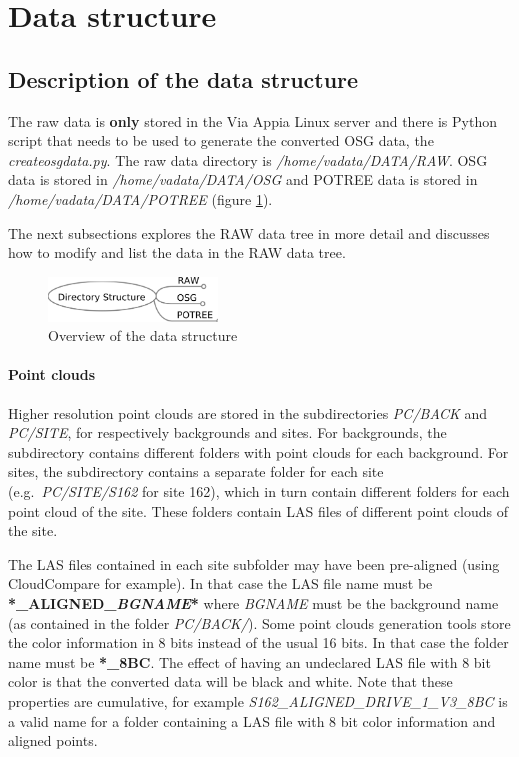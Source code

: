 \section{Data structure}
\label{sec:data_structure}

\subsection{Description of the data structure}
The raw data is \textbf{only} stored in the Via Appia Linux server and there is Python script that needs to be used to generate the converted OSG data, the \textit{createosgdata.py}. The raw data directory is \textit{/home/vadata/DATA/RAW}. OSG data is stored in \textit{/home/vadata/DATA/OSG} and POTREE data is stored in \textit{/home/vadata/DATA/POTREE} (figure \ref{fig:directory_structure_overview}). 

The next subsections explores the RAW data tree in more detail and discusses how to modify and list the data in the RAW data tree.

\begin{figure}[!ht]
 \centering
 \includegraphics[width=0.4\textwidth]{fig/directory_structure_overview}
 \caption{Overview of the data structure}
 \label{fig:directory_structure_overview}
\end{figure}

\paragraph{Point clouds}
Higher resolution point clouds are stored in the subdirectories \textit{PC/BACK} and \textit{PC/SITE}, for respectively backgrounds and sites. For backgrounds, the subdirectory contains different folders with point clouds for each background. For sites, the subdirectory contains a separate folder for each site (e.g.\ \textit{PC/SITE/S162} for site 162), which in turn contain different folders for each point cloud of the site. These folders contain LAS files of different point clouds of the site. 

The LAS files contained in each site subfolder may have been pre-aligned (using CloudCompare for example). In that case the LAS file name must be \textbf{*\_ALIGNED\_\textit{BGNAME}*} where \textit{BGNAME} must be the background name (as contained in the folder \textit{PC/BACK/}).
Some point clouds generation tools store the color information in 8 bits instead of the usual 16 bits. In that case the folder name must be \textbf{*\_8BC}. The effect of having an undeclared LAS file with 8 bit color is that the converted data will be black and white. Note that these properties are cumulative, for example \textit{S162\_ALIGNED\_DRIVE\_1\_V3\_8BC} is a valid name for a folder containing a LAS file with 8 bit color information and aligned points.

